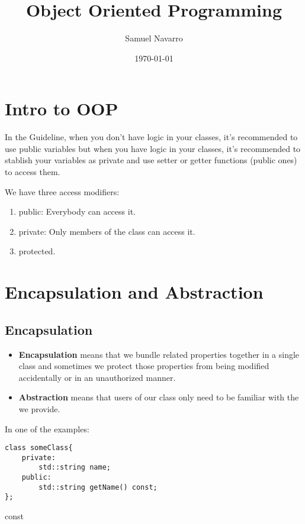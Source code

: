 \documentclass[11pt, a4paper]{article}
\begin{document}
\title{Object Oriented Programming}
\author{Samuel Navarro}
\date{\today}
\maketitle

\tableofcontents
	

\section{Intro to OOP}%
\label{sec:intro_to_oop}

In the Guideline, when you don't have logic in your classes, it's recommended to use public variables but when you have logic in your classes, it's recommended to stablish your variables as private and use setter or getter functions (public ones) to access them. 


We have three access modifiers:

\begin{enumerate}
	\item public: Everybody can access it.
	\item private: Only members of the class can access it.
	\item protected.
\end{enumerate}


\section{Encapsulation and Abstraction}%
\label{sec:encapsulation_and_abstraction}


\subsection{Encapsulation}%
\label{sub:encapsulation}



\begin{itemize}
	\item \textbf{Encapsulation} means that we bundle related properties together in a single class and sometimes we protect those properties from being modified accidentally or in an unauthorized manner. 
	\item \textbf{Abstraction} means that users of our class only need to be familiar with the we provide. 
\end{itemize}




In one of the examples:
 
\begin{listing}[hbt!]
\begin{verbatim}
class someClass{
	private:
		std::string name;
	public:
		std::string getName() const;
};

\end{verbatim}
\caption{const}
\label{lst:const}
\end{listing}
\end{document}

